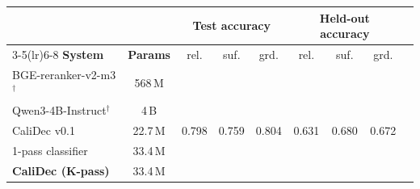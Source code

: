 \begin{tabular}{lcccccccc}
\toprule
& & \multicolumn{3}{c}{\textbf{Test accuracy}} & \multicolumn{3}{c}{\textbf{Held-out accuracy}} \\
\cmidrule(lr){3-5}\cmidrule(lr){6-8}
\textbf{System} & \textbf{Params} & rel. & suf. & grd. & rel. & suf. & grd. \\
\midrule
BGE-reranker-v2-m3$^\dagger$ & 568\,M & \ph{--} & \ph{--} & \ph{--} & \ph{--} & \ph{--} & \ph{--} \\
Qwen3-4B-Instruct$^\dagger$ & 4\,B & \ph{--} & \ph{--} & \ph{--} & \ph{--} & \ph{--} & \ph{--} \\
\midrule
CaliDec v0.1 & 22.7\,M & 0.798 & 0.759 & 0.804 & 0.631 & 0.680 & 0.672 \\
1-pass classifier & 33.4\,M & \ph{--} & \ph{--} & \ph{--} & \ph{--} & \ph{--} & \ph{--} \\
\textbf{CaliDec (K-pass)} & 33.4\,M & \ph{--} & \ph{--} & \ph{--} & \ph{--} & \ph{--} & \ph{--} \\
\bottomrule
\end{tabular}
